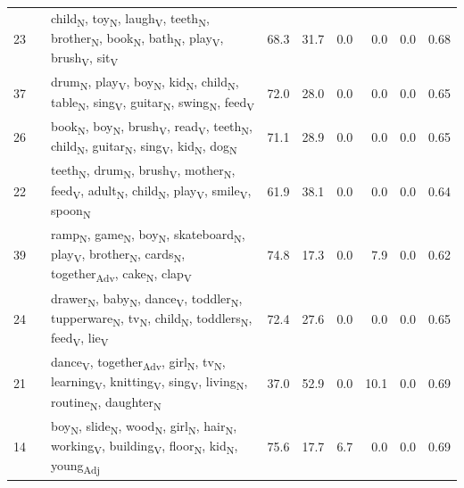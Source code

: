 \begin{landscape}
\begin{xltabular}{\linewidth}{r >{\raggedright\arraybackslash}p{2.9cm} >{\raggedright\arraybackslash}X r r r r r r}
23 &  & child\textsubscript{N}, toy\textsubscript{N}, laugh\textsubscript{V}, teeth\textsubscript{N}, brother\textsubscript{N}, book\textsubscript{N}, bath\textsubscript{N}, play\textsubscript{V}, brush\textsubscript{V}, sit\textsubscript{V} & 68.3 & 31.7 & 0.0 & 0.0 & 0.0 & 0.68 \\
37 &  & drum\textsubscript{N}, play\textsubscript{V}, boy\textsubscript{N}, kid\textsubscript{N}, child\textsubscript{N}, table\textsubscript{N}, sing\textsubscript{V}, guitar\textsubscript{N}, swing\textsubscript{N}, feed\textsubscript{V} & 72.0 & 28.0 & 0.0 & 0.0 & 0.0 & 0.65 \\
26 &  & book\textsubscript{N}, boy\textsubscript{N}, brush\textsubscript{V}, read\textsubscript{V}, teeth\textsubscript{N}, child\textsubscript{N}, guitar\textsubscript{N}, sing\textsubscript{V}, kid\textsubscript{N}, dog\textsubscript{N} & 71.1 & 28.9 & 0.0 & 0.0 & 0.0 & 0.65 \\
22 &  & teeth\textsubscript{N}, drum\textsubscript{N}, brush\textsubscript{V}, mother\textsubscript{N}, feed\textsubscript{V}, adult\textsubscript{N}, child\textsubscript{N}, play\textsubscript{V}, smile\textsubscript{V}, spoon\textsubscript{N} & 61.9 & 38.1 & 0.0 & 0.0 & 0.0 & 0.64 \\
39 &  & ramp\textsubscript{N}, game\textsubscript{N}, boy\textsubscript{N}, skateboard\textsubscript{N}, play\textsubscript{V}, brother\textsubscript{N}, cards\textsubscript{N}, together\textsubscript{Adv}, cake\textsubscript{N}, clap\textsubscript{V} & 74.8 & 17.3 & 0.0 & 7.9 & 0.0 & 0.62 \\
24 &  & drawer\textsubscript{N}, baby\textsubscript{N}, dance\textsubscript{V}, toddler\textsubscript{N}, tupperware\textsubscript{N}, tv\textsubscript{N}, child\textsubscript{N}, toddlers\textsubscript{N}, feed\textsubscript{V}, lie\textsubscript{V} & 72.4 & 27.6 & 0.0 & 0.0 & 0.0 & 0.65 \\
21 &  & dance\textsubscript{V}, together\textsubscript{Adv}, girl\textsubscript{N}, tv\textsubscript{N}, learning\textsubscript{V}, knitting\textsubscript{V}, sing\textsubscript{V}, living\textsubscript{N}, routine\textsubscript{N}, daughter\textsubscript{N} & 37.0 & 52.9 & 0.0 & 10.1 & 0.0 & 0.69 \\
14 &  & boy\textsubscript{N}, slide\textsubscript{N}, wood\textsubscript{N}, girl\textsubscript{N}, hair\textsubscript{N}, working\textsubscript{V}, building\textsubscript{V}, floor\textsubscript{N}, kid\textsubscript{N}, young\textsubscript{Adj} & 75.6 & 17.7 & 6.7 & 0.0 & 0.0 & 0.69 \\

\end{xltabular}
\end{landscape}
